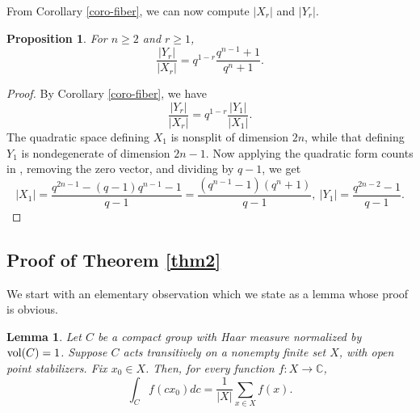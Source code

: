 \documentclass[12pt]{amsart}
\newtheorem{lemma}[theorem]{Lemma}%
\newtheorem{proposition}[theorem]{Proposition}
\theoremstyle{definition}
\theoremstyle{remark}
\begin{document}
From Corollary \ref{coro-fiber}, we can now compute $|X_r|$ and $|Y_r|$.
\begin{proposition}\label{prop-cardinality}
For $n \geq 2$ and $r \geq 1$,
\[
\frac{|Y_r|}{|X_r|}
=q^{1-r}\frac{q^{n-1}+1}{q^n+1}.
\]
\end{proposition}

\begin{proof}
By Corollary \ref{coro-fiber}, we have
\[
\frac{|Y_r|}{|X_r|}
=q^{1-r}\frac{|Y_1|}{|X_1|}.
\]
The quadratic space defining $X_1$ is nonsplit of dimension $2n$, while that defining $Y_1$ is nondegenerate of dimension $2n-1$. Now applying the quadratic form counts in \cite[Theorems 6.26-6.27]{ln97}, removing the zero vector, and dividing by $q-1$, we get
\[
|X_1|
=\frac{q^{2n-1}-(q-1)q^{n-1}-1}{q-1}
=\frac{(q^{n-1}-1)(q^n+1)}{q-1}, ~
|Y_1|=\frac{q^{2n-2}-1}{q-1}.
\]
\end{proof}

\subsection{Proof of Theorem \ref{thm2}}\label{sub-pf-thm2}

We start with an elementary observation which we state as a lemma whose proof is obvious.
\begin{lemma}\label{lemma-ic}
Let $C$ be a compact group with Haar measure normalized by ${\rm vol}(C)=1$. Suppose $C$ acts transitively on a nonempty finite set $X$, with open point stabilizers. Fix $x_0\in X$. Then, for every function $f:X\to\mathbb C$,
\[
\int_C f(c x_0)dc
=\frac{1}{|X|}\sum_{x\in X}f(x).
\]
\end{lemma}
\end{document}
